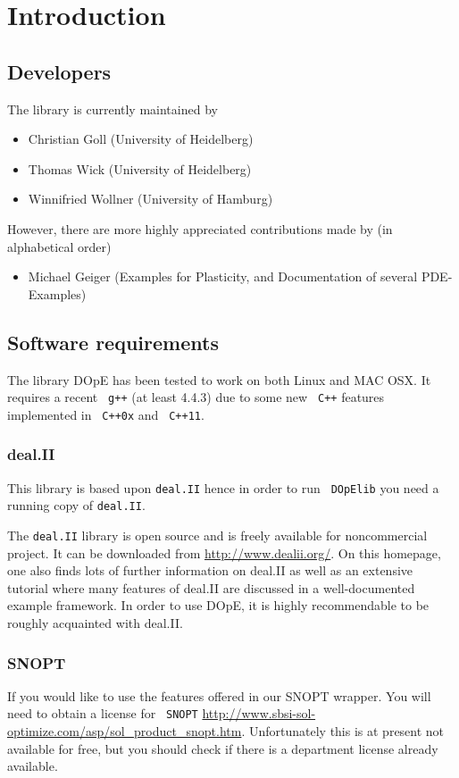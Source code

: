 \chapter{Introduction}\label{chap:intro}
\section{Developers}
The library is currently maintained by 
\begin{itemize}
  \item Christian Goll (University of Heidelberg)
  \item Thomas Wick (University of Heidelberg)
  \item Winnifried Wollner (University of Hamburg)
\end{itemize}

However, there are more highly appreciated contributions
made by (in alphabetical order)
\begin{itemize}
  \item Michael Geiger (Examples for Plasticity, and Documentation of several PDE-Examples)
\end{itemize}

\section{Software requirements}
The library DOpE has been tested to work on both Linux and 
MAC OSX. It requires a recent \texttt{ g++} (at least 4.4.3) due to 
some new \texttt{ C++} features implemented in \texttt{ C++0x} and \texttt{ C++11}. 

\subsection{deal.II}
This library is based upon \texttt{deal.II} hence in order to run 
\texttt{ DOpElib} you need a running copy of \texttt{deal.II}.

The \texttt{deal.II} library is open source and is freely available for noncommercial project.
It can be downloaded from \url{http://www.dealii.org/}. On this
homepage, one also finds lots of further information on deal.II as well as
an extensive tutorial where many features of deal.II are discussed in a
well-documented example framework. In order to use DOpE, it is highly
recommendable to be roughly acquainted with deal.II.

\subsection{SNOPT}
If you would like to use the features offered in our SNOPT wrapper. You will 
need to obtain a license for \texttt{ SNOPT} 
\url{http://www.sbsi-sol-optimize.com/asp/sol_product_snopt.htm}.
Unfortunately this is at present not available for free, but you should 
check if 
there is a department license already available.

